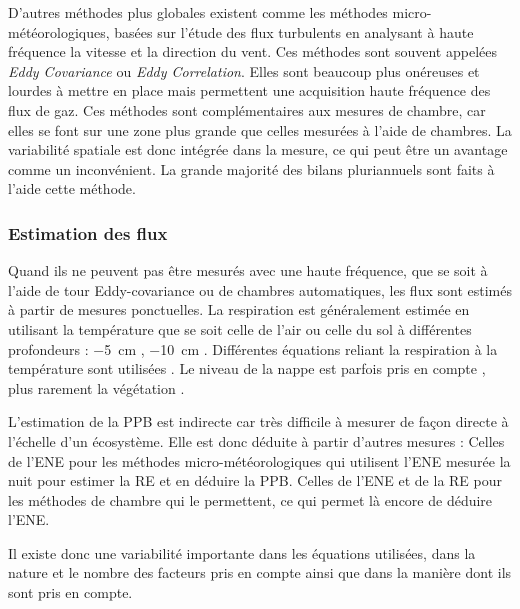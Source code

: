D'autres méthodes plus globales existent comme les méthodes micro-météorologiques, basées sur l'étude des flux turbulents en analysant à haute fréquence la vitesse et la direction du vent.
Ces méthodes sont souvent appelées \textit{Eddy Covariance} ou \textit{Eddy Correlation}.
Elles sont beaucoup plus onéreuses et lourdes à mettre en place mais permettent une acquisition haute fréquence des flux de gaz.
Ces méthodes sont complémentaires aux mesures de chambre, car elles se font sur une zone plus grande que celles mesurées à l'aide de chambres.
La variabilité spatiale est donc intégrée dans la mesure, ce qui peut être un avantage comme un inconvénient.
La grande majorité des bilans pluriannuels sont faits à l'aide cette méthode.

\subsubsection{Estimation des flux}
Quand ils ne peuvent pas être mesurés avec une haute fréquence, que se soit à l'aide de tour Eddy-covariance ou de chambres automatiques, les flux sont estimés à partir de mesures ponctuelles.
La respiration est généralement estimée en utilisant la température que se soit celle de l'air \citep{bortoluzzi2006a} ou celle du sol à différentes profondeurs : \SI{-5}{\centi\metre} \citep{gorres2014,ballantyne2014}, \SI{-10}{\centi\metre} \cite{kim1992,zhu2015}.
Différentes équations reliant la respiration à la température sont utilisées \citep{fang2001}.
Le niveau de la nappe est parfois pris en compte \citep{strack2013,munir2015}, plus rarement la végétation \citep{bortoluzzi2006a,karki2015}.

L'estimation de la PPB est indirecte car très difficile à mesurer de façon directe à l'échelle d'un écosystème.
Elle est donc déduite à partir d'autres mesures :
Celles de l'ENE pour les méthodes micro-météorologiques qui utilisent l'ENE mesurée la nuit pour estimer la RE et en déduire la PPB.
Celles de l'ENE et de la RE pour les méthodes de chambre qui le permettent, ce qui permet là encore de déduire l'ENE.

Il existe donc une variabilité importante dans les équations utilisées, dans la nature et le nombre des facteurs pris en compte ainsi que dans la manière dont ils sont pris en compte.
